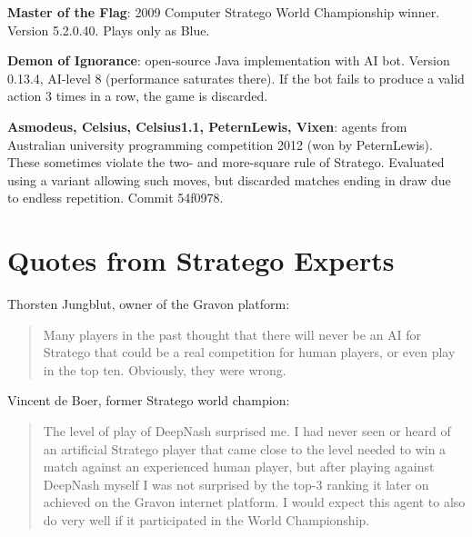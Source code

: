 \textbf{Master of the Flag}: 2009 Computer Stratego World Championship winner. Version 5.2.0.40. Plays only as Blue.

\textbf{Demon of Ignorance}: open-source Java implementation with AI bot. Version 0.13.4, AI-level 8 (performance saturates there). If the bot fails to produce a valid action 3 times in a row, the game is discarded.

\textbf{Asmodeus, Celsius, Celsius1.1, PeternLewis, Vixen}: agents from Australian university programming competition 2012 (won by PeternLewis). These sometimes violate the two- and more-square rule of Stratego. Evaluated using a variant allowing such moves, but discarded matches ending in draw due to endless repetition. Commit 54f0978.

\section{Quotes from Stratego Experts}
Thorsten Jungblut, owner of the Gravon platform:
\begin{quote}
Many players in the past thought that there will never be an AI for Stratego that could be a real competition for human players, or even play in the top ten. Obviously, they were wrong.
\end{quote}

Vincent de Boer, former Stratego world champion:
\begin{quote}
The level of play of DeepNash surprised me. I had never seen or heard of an artificial Stratego player that came close to the level needed to win a match against an experienced human player, but after playing against DeepNash myself I was not surprised by the top-3 ranking it later on achieved on the Gravon internet platform. I would expect this agent to also do very well if it participated in the World Championship.
\end{quote}
